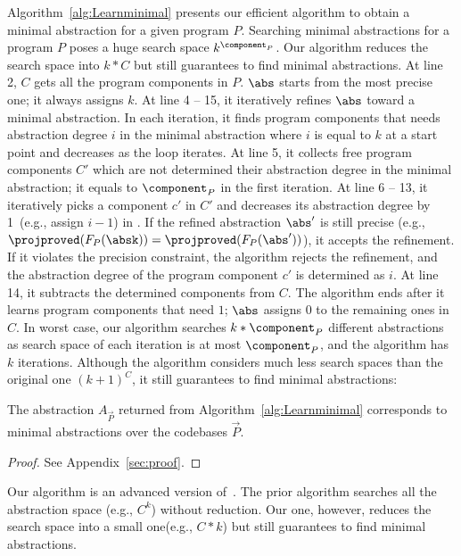 Algorithm~\ref{alg:Learnminimal} presents our efficient algorithm to
obtain a minimal abstraction for a given program $P$.
Searching minimal abstractions for a program $P$ poses a huge search space $k^{\component_P}$.
Our algorithm reduces the search space into $k*C$ but still guarantees to find minimal abstractions.
At line 2, $C$ gets all the program components in $P$.
$\abs$ starts from the most precise one; it always assigns $k$.
At line 4 -- 15, it iteratively refines $\abs$ toward a minimal abstraction.
In each iteration, it finds program components that needs abstraction degree $i$ in the minimal abstraction
where $i$ is equal to $k$ at a start point and decreases as the loop iterates.
At line 5, it collects free program components $C'$ which are not determined their 
abstraction degree in the minimal abstraction; it equals to $\component_P$ in the first iteration.
At line 6 -- 13, it iteratively picks a component $c'$ in $C'$ and decreases its abstraction 
degree by 1~(e.g., assign $i-1$) in \abs. If the refined abstraction $\abs'$ is still precise 
(e.g., ${\projproved}(F_P(\absk)) = {\projproved}(F_P(\abs'))$), it accepts the refinement.
If it violates the precision constraint, the algorithm rejects the refinement, and the abstraction degree of the program component $c'$ is determined as $i$. 
At line 14, it subtracts the determined components from $C$.
The algorithm ends after it learns program components that need $1$;
$\abs$ assigns $0$ to the remaining ones in $C$.
In worst case, our algorithm searches
$k*\component_P$ different abstractions as search space of each iteration is
at most $\component_P$, and the algorithm has $k$ iterations.
Although the algorithm considers much less search spaces than the original one
$(k+1)^C$, it still guarantees to find minimal abstractions:
\begin{theorem}\label{THM:REDUCESPACE}
The abstraction $A_\vec{P}$ returned from
Algorithm~\ref{alg:Learnminimal} corresponds to minimal abstractions over the
codebases $\vec{P}$.
\end{theorem}
\begin{proof}
See Appendix~\ref{sec:proof}.
\end{proof}
Our algorithm is an advanced version of~\citet{Liang2011learning}.
The prior algorithm searches all the abstraction space (e.g., $C^{k}$) without reduction.
Our one, however, reduces the search space into a small one(e.g., $C*{k}$) but
still guarantees to find minimal abstractions.

